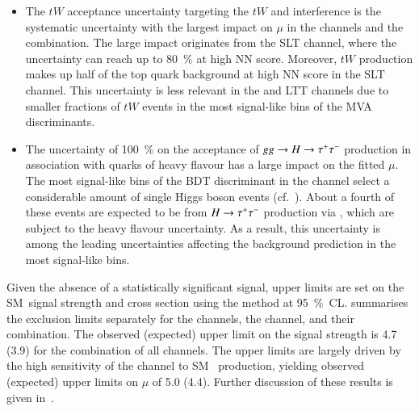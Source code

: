 \begin{itemize}
\item The $tW$ acceptance uncertainty targeting the $tW$ and \ttbar interference
  is the systematic uncertainty with the largest impact on $\mu$ in the \lephad
  channels and the combination. The large impact originates from the \lephad SLT
  channel, where the uncertainty can reach up to \SI{80}{\percent} at high NN
  score. Moreover, $tW$ production makes up half of the top quark background at
  high NN score in the \lephad SLT channel. This uncertainty is less relevant in
  the \hadhad and \lephad LTT channels due to smaller fractions of $tW$ events
  in the most signal-like bins of the MVA discriminants.

\item The uncertainty of \SI{100}{\percent} on the acceptance of
  $gg \to H \to \tau^{+} \tau^{-}$ production in association with quarks of heavy flavour
  has a large impact on the fitted $\mu$. The most signal-like bins of the BDT
  discriminant in the \hadhad channel select a considerable amount of single
  Higgs boson events (cf.~). About a
  fourth of these events are expected to be from $H \to \tau^{+} \tau^{-}$ production via
  \ggF, which are subject to the heavy flavour uncertainty. As a result, this
  uncertainty is among the leading uncertainties affecting the background
  prediction in the most signal-like bins.

\end{itemize}
%

Given the absence of a statistically significant signal, upper limits are set on
the SM~\HH signal strength and cross section using the \CLs method at
\SI{95}{\percent}~CL.  summarises the exclusion
limits separately for the \lephad channels, the \hadhad channel, and their
combination. The observed (expected) upper limit on the signal strength is
\num{4.7} (\num{3.9}) for the combination of all channels. The upper limits are
largely driven by the high sensitivity of the \hadhad channel to SM~\HH
production, yielding observed (expected) upper limits on $\mu$ of \num{5.0}
(\num{4.4}). Further discussion of these results is given
in~.

